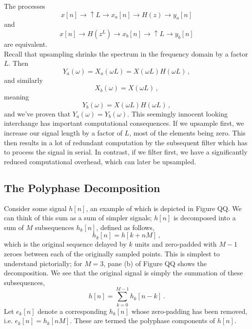 %
\begin{iden}
  The processes
  \begin{displaymath}
    x[n] \longrightarrow \boxed{\uparrow L} \longrightarrow x_a[n]
    \longrightarrow \boxed{H(z)} \longrightarrow y_a[n]
  \end{displaymath}
  and
  \begin{displaymath}
    x[n] \longrightarrow \boxed{H\left(z^L\right)} \longrightarrow x_b[n]
    \longrightarrow \boxed{\uparrow L} \longrightarrow y_b[n]
  \end{displaymath}
  are equivalent.\\

  Recall that upsampling shrinks the spectrum in the frequency domain by a factor
  $L$. Then
  \begin{displaymath}
    Y_a(\omega) = X_a(\omega L) = X(\omega L)H(\omega L) \,,
  \end{displaymath}
  and similarly
  \begin{displaymath}
    X_b(\omega) = X(\omega L) \,,
  \end{displaymath}
  meaning
  \begin{displaymath}
    Y_b(\omega) = X(\omega L)H(\omega L) \,,
  \end{displaymath}
  and we've proven that $Y_a(\omega) = Y_b(\omega)$. This seemingly innocent looking
  interchange has important computational consequences. If we upsample first, we increase
  our signal length by a factor of $L$, most of the elements being zero. This then
  results in a lot of redundant computation by the subsequent filter which has to
  process the signal in serial. In contrast, if we filter first, we have a significantly
  reduced computational overhead, which can later be upsampled.
\end{iden}

\subsection{The Polyphase Decomposition}
%
Consider some signal $h[n]$, an example of which is depicted in Figure QQ. We can think
of this sum as a sum of simpler signals; $h[n]$ is decomposed into a sum of $M$
subsequences $h_k[n]$, defined as follows,
%
\begin{displaymath}
  h_k[n] = h[k + nM] \,,
\end{displaymath}
%
which is the original sequence delayed by $k$ units and zero-padded with $M-1$ zeroes
between each of the originally sampled points. This is simplest to understand pictorially;
for $M=3$, pane (b) of Figure QQ shows the decomposition. We see that the original
signal is simply the summation of these subsequences,
%
\begin{displaymath}
  h[n] = \sum_{k=0}^{M-1}h_k[n-k] \,.
\end{displaymath}
%
Let $e_k[n]$ denote a corresponding $h_k[n]$ whose zero-padding has been removed, i.e.
$e_k[n] = h_k[nM]$. These are termed the polyphase components of $h[n]$.
